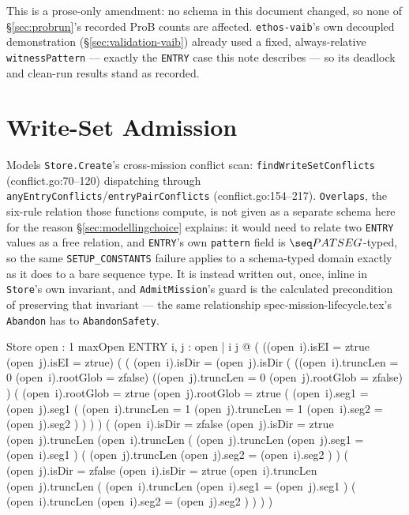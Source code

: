 \documentclass[a4paper,10pt,fleqn]{article}
\newcommand{\field}[1]{\texttt{#1}}
\begin{document}
This is a prose-only amendment: no schema in this document changed,
so none of \S\ref{sec:probrun}'s recorded ProB counts are affected.
\field{ethos-vaib}'s own decoupled demonstration
(\S\ref{sec:validation-vaib}) already used a fixed, always-relative
\field{witnessPattern} --- exactly the \field{ENTRY} case this note
describes --- so its deadlock and clean-run results stand as
recorded.

\section{Write-Set Admission}
\label{sec:admission}

Models \field{Store.Create}'s cross-mission conflict scan:
\field{findWriteSetConflicts} (conflict.go:70--120) dispatching
through \field{anyEntryConflicts}/\field{entryPairConflicts}
(conflict.go:154--217). \field{Overlaps}, the six-rule relation those
functions compute, is not given as a separate schema here for the
reason \S\ref{sec:modellingchoice} explains: it would need to relate
two \field{ENTRY} values as a free \fuzz{} relation, and
\field{ENTRY}'s own \field{pattern} field is $\seq PATSEG$-typed, so
the same \texttt{SETUP\_CONSTANTS} failure applies to a schema-typed
domain exactly as it does to a bare sequence type. It is instead
written out, once, inline in \field{Store}'s own invariant, and
\field{AdmitMission}'s guard is the calculated precondition of
preserving that invariant --- the same relationship
spec-mission-lifecycle.tex's \field{Abandon} has to
\field{AbandonSafety}.

\begin{schema}{Store}
open : 1 \upto maxOpen \pfun ENTRY
\where
\forall i, j : \dom open | i \neq j @
  \lnot ( \lnot ((open\ i).isEI = ztrue \land (open\ j).isEI = ztrue) \land
    ( ( (open\ i).isDir = (open\ j).isDir \land
        \lnot ( ((open\ i).truncLen = 0 \land (open\ i).rootGlob = zfalse)
                \lor ((open\ j).truncLen = 0 \land (open\ j).rootGlob = zfalse) ) \land
        ( (open\ i).rootGlob = ztrue \lor (open\ j).rootGlob = ztrue
          \lor ( (open\ i).seg1 = (open\ j).seg1 \land
                ( (open\ i).truncLen = 1 \lor (open\ j).truncLen = 1
                  \lor (open\ i).seg2 = (open\ j).seg2 ) ) ) )
      \lor ( (open\ i).isDir = zfalse \land (open\ j).isDir = ztrue \land
        (open\ j).truncLen \leq (open\ i).truncLen \land
        ( (open\ j).truncLen  \implies (open\ j).seg1 = (open\ i).seg1 ) \land
        ( (open\ j).truncLen  \implies (open\ j).seg2 = (open\ i).seg2 ) )
      \lor ( (open\ j).isDir = zfalse \land (open\ i).isDir = ztrue \land
        (open\ i).truncLen \leq (open\ j).truncLen \land
        ( (open\ i).truncLen  \implies (open\ i).seg1 = (open\ j).seg1 ) \land
        ( (open\ i).truncLen  \implies (open\ i).seg2 = (open\ j).seg2 ) ) ) )
\end{schema}
\end{document}
